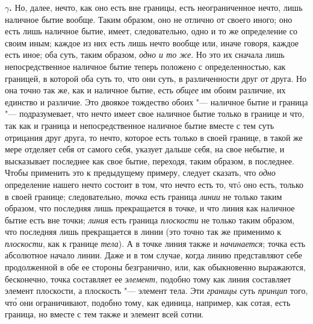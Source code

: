 {\bfseries $\gamma $.} Но, далее, нечто, как оно есть вне границы, есть
неограниченное нечто, лишь наличное бытие вообще. Таким образом, оно не
отлично от своего иного; оно есть лишь наличное бытие, имеет,
следовательно, одно и то же определение со своим иным; каждое из них есть
лишь нечто вообще или, иначе говоря, каждое есть иное; оба суть, таким
образом, {\em одно и то же}. Но это их сначала лишь
непосредственное наличное бытие теперь положено с определенностью, как
границей, в которой оба суть то, что они суть, в различенности друг от
друга. Но она точно так же, как и наличное бытие, есть
{\em общее} им обоим различие, их единство и различие.
Это двоякое тождество обоих "--- наличное бытие и граница "--- подразумевает, что
нечто имеет свое наличное бытие только в границе и что, так как и граница и
непосредственное наличное бытие вместе с тем суть отрицания друг друга, то
нечто, которое есть только в своей границе, в такой же мере отделяет себя
от самого себя, указует дальше себя, на свое небытие, и высказывает
последнее как свое бытие, переходя, таким образом, в последнее. Чтобы
применить это к предыдущему примеру, следует сказать, что
{\em одно} определение нашего нечто состоит в том, что
нечто есть то, чтó оно есть, только в своей границе; следовательно,
{\em точка} есть граница
{\em линии} не только таким образом, что последняя лишь
прекращается в точке, и что линия как наличное бытие есть вне точки;
{\em линия} есть граница
{\em плоскости} не только таким образом, что последняя
лишь прекращается в линии (это точно так же применимо к
{\em плоскости}, как к границе
{\em тела}). А в точке линия также и
{\em начинается}; точка есть абсолютное начало линии.
Даже и в том случае, когда линию представляют себе продолженной в обе ее
стороны безгранично, или, как обыкновенно выражаются, бесконечно, точка
составляет ее {\em элемент}, подобно тому как линия
составляет элемент плоскости, а плоскость "--- элемент тела. Эти
{\em границы} суть {\em принцип}
того, чт\'{о} они ограничивают, подобно тому, как единица, например, как сотая,
есть граница, но вместе с тем также и элемент всей сотни.


